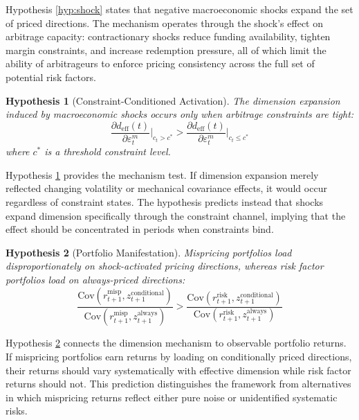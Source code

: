 \documentclass[12pt,letterpaper]{article}
\theoremstyle{plain}
\newtheorem{hypothesis}{Hypothesis}
\theoremstyle{definition}
\newcommand{\Cov}{\mathrm{Cov}}
\newcommand{\deff}{d_{\text{eff}}}
\begin{document}
Hypothesis \ref{hyp:shock} states that negative macroeconomic shocks expand the set of priced directions. The mechanism operates through the shock's effect on arbitrage capacity: contractionary shocks reduce funding availability, tighten margin constraints, and increase redemption pressure, all of which limit the ability of arbitrageurs to enforce pricing consistency across the full set of potential risk factors.

\begin{hypothesis}[Constraint-Conditioned Activation]\label{hyp:constraint}
The dimension expansion induced by macroeconomic shocks occurs only when arbitrage constraints are tight:
\begin{equation}
\frac{\partial \deff(t)}{\partial \varepsilon_t^m} \Bigg|_{c_t > c^*} > \frac{\partial \deff(t)}{\partial \varepsilon_t^m} \Bigg|_{c_t \leq c^*}
\end{equation}
where $c^*$ is a threshold constraint level.
\end{hypothesis}

Hypothesis \ref{hyp:constraint} provides the mechanism test. If dimension expansion merely reflected changing volatility or mechanical covariance effects, it would occur regardless of constraint states. The hypothesis predicts instead that shocks expand dimension specifically through the constraint channel, implying that the effect should be concentrated in periods when constraints bind.

\begin{hypothesis}[Portfolio Manifestation]\label{hyp:portfolio}
Mispricing portfolios load disproportionately on shock-activated pricing directions, whereas risk factor portfolios load on always-priced directions:
\begin{equation}
\frac{\Cov(r^{\text{misp}}_{t+1}, z^{\text{conditional}}_{t+1})}{\Cov(r^{\text{misp}}_{t+1}, z^{\text{always}}_{t+1})} > \frac{\Cov(r^{\text{risk}}_{t+1}, z^{\text{conditional}}_{t+1})}{\Cov(r^{\text{risk}}_{t+1}, z^{\text{always}}_{t+1})}
\end{equation}
\end{hypothesis}

Hypothesis \ref{hyp:portfolio} connects the dimension mechanism to observable portfolio returns. If mispricing portfolios earn returns by loading on conditionally priced directions, their returns should vary systematically with effective dimension while risk factor returns should not. This prediction distinguishes the framework from alternatives in which mispricing returns reflect either pure noise or unidentified systematic risks.
\end{document}
